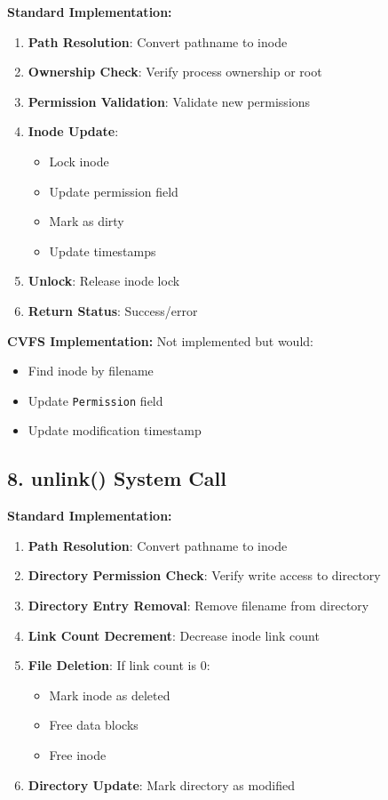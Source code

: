 \documentclass[11pt,a4paper]{article}
\begin{document}
\textbf{Standard Implementation:}
\begin{enumerate}
    \item \textbf{Path Resolution}: Convert pathname to inode
    \item \textbf{Ownership Check}: Verify process ownership or root
    \item \textbf{Permission Validation}: Validate new permissions
    \item \textbf{Inode Update}: 
    \begin{itemize}
        \item Lock inode
        \item Update permission field
        \item Mark as dirty
        \item Update timestamps
    \end{itemize}
    \item \textbf{Unlock}: Release inode lock
    \item \textbf{Return Status}: Success/error
\end{enumerate}

\textbf{CVFS Implementation:}
Not implemented but would:
\begin{itemize}
    \item Find inode by filename
    \item Update \texttt{Permission} field
    \item Update modification timestamp
\end{itemize}

\subsection{8. unlink() System Call}

\textbf{Standard Implementation:}
\begin{enumerate}
    \item \textbf{Path Resolution}: Convert pathname to inode
    \item \textbf{Directory Permission Check}: Verify write access to directory
    \item \textbf{Directory Entry Removal}: Remove filename from directory
    \item \textbf{Link Count Decrement}: Decrease inode link count
    \item \textbf{File Deletion}: If link count is 0:
    \begin{itemize}
        \item Mark inode as deleted
        \item Free data blocks
        \item Free inode
    \end{itemize}
    \item \textbf{Directory Update}: Mark directory as modified
\end{enumerate}
\end{document}

